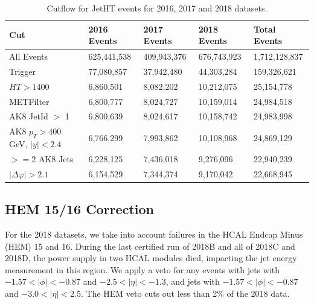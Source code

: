 \begin{table}
	\begin{center}
		\begin{tabular}{|p{4cm}||p{2cm}||p{2cm}||p{2cm}||p{2cm}|   } \hline 
			\textbf{Cut} & \textbf{2016 Events} & \textbf{2017 Events} & \textbf{2018 Events} & \textbf{Total Events} \\ \hline
			All Events                                 &  625,441,538  &  409,943,376 &  676,743,923  &  1,712,128,837 \\
			Trigger                                     &  77,080,857  &  37,942,480 &  44,303,284  &  159,326,621 \\
			$HT > 1400$                                 &  6,860,501  &  8,082,202 &  10,212,075  &  25,154,778 \\
			METFilter                                   &  6,800,777  &  8,024,727 &  10,159,014  &  24,984,518 \\
			AK8 JetId $>$ 1               &  6,800,639  &  8,024,617 &  10,158,742  &  24,983,998 \\
			AK8 $p_T > 400$ GeV, $|y| < 2.4$    &  6,766,299  &  7,993,862 &  10,108,968  &  24,869,129 \\
			$>=2$ AK8 Jets                               &  6,228,125  &  7,436,018 &  9,276,096  &  22,940,239 \\
			$|\Delta\varphi| > 2.1$                     &  6,154,529  &  7,344,374 &  9,170,042  &  22,668,945 \\
			\hline
		\end{tabular}
		\caption{Cutflow for JetHT events for 2016, 2017 and 2018 datasets.}
		\label{tab:cutflow}
	\end{center}
\end{table}





\subsection{HEM 15/16 Correction}

For the 2018 datasets, we take into account failures in the HCAL Endcap Minus (HEM) 15 and 16. During the last certified run of 2018B and all of 2018C and 2018D, the power supply in two HCAL modules died, impacting the jet energy measurement in this region. We apply a veto for any events with jets with $-1.57 < |\phi| < -0.87$ and $-2.5 < |\eta| < -1.3$, and jets with $-1.57 < |\phi| < -0.87$ and $-3.0< |\eta| < 2.5$. The HEM veto cuts out less than 2\% of the 2018 data.






